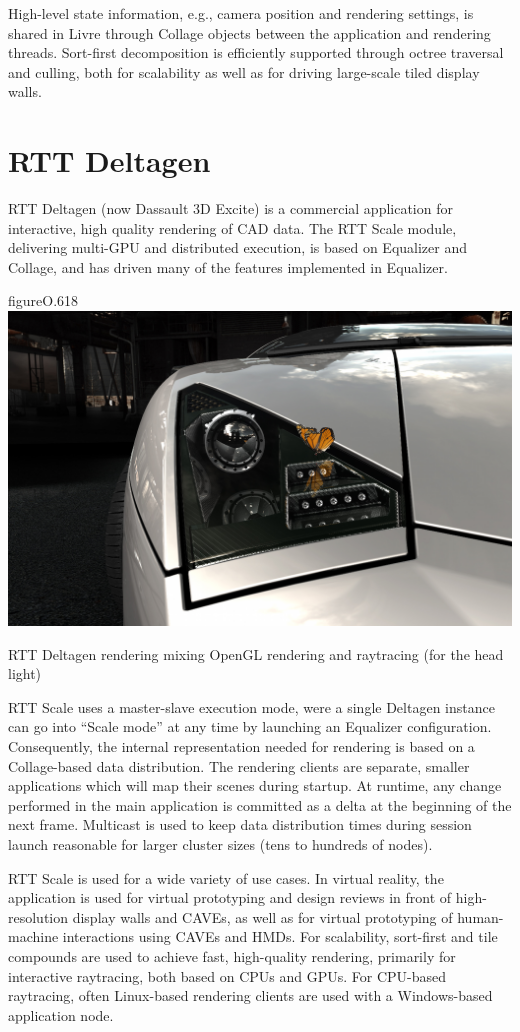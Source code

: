 High-level state information, e.g., camera position and rendering settings, is
shared in Livre through \textsf{Collage} objects between the application and
rendering threads. Sort-first decomposition is efficiently supported through
octree traversal and culling, both for scalability as well as for driving
large-scale tiled display walls.

\section{RTT Deltagen}

RTT Deltagen (now Dassault 3D Excite) is a commercial application for
interactive, high quality rendering of CAD data. The RTT Scale module,
delivering multi-GPU and distributed execution, is based on \textsf{Equalizer}
and \textsf{Collage}, and has driven many of the features implemented in
Equalizer.

\begin{wrapfloat}{figure}{O}{.618\textwidth}
  \includegraphics[width=.618\textwidth]{images/DeltaGen}
  {\caption{\label{fDeltaGen}RTT Deltagen rendering mixing OpenGL rendering and raytracing (for the head light)}}
\end{wrapfloat}

RTT Scale uses a master-slave execution mode, were a single Deltagen instance
can go into ``Scale mode'' at any time by launching an \textsf{Equalizer}
configuration. Consequently, the internal representation needed for rendering
is based on a \textsf{Collage}-based data distribution. The rendering clients
are separate, smaller applications which will map their scenes during startup.
At runtime, any change performed in the main application is committed as a
delta at the beginning of the next frame. Multicast is used to keep data
distribution times during session launch reasonable for larger cluster sizes
(tens to hundreds of nodes).

RTT Scale is used for a wide variety of use cases. In virtual reality, the
application is used for virtual prototyping and design reviews in front of
high-resolution display walls and CAVEs, as well as for virtual prototyping of
human-machine interactions using CAVEs and HMDs. For scalability, sort-first and
tile compounds are used to achieve fast, high-quality rendering, primarily for
interactive raytracing, both based on CPUs and GPUs. For CPU-based raytracing,
often Linux-based rendering clients are used with a Windows-based application
node.

